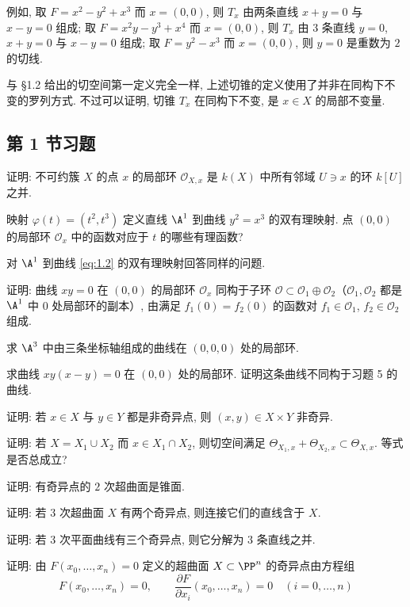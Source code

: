 例如, 取 $F = x^2 - y^2 + x^3$ 而 $x = (0,0)$, 则 $T_x$ 由两条直线 $x + y = 0$ 与 $x - y = 0$ 组成; 取 $F = x^2 y - y^3 + x^4$ 而 $x = (0,0)$, 则 $T_x$ 由 $3$ 条直线 $y = 0$, $x + y = 0$ 与 $x - y = 0$ 组成; 取 $F = y^2 - x^3$ 而 $x = (0,0)$, 则 $y = 0$ 是重数为 $2$ 的切线.

与 §1.2 给出的切空间第一定义完全一样, 上述切锥的定义使用了并非在同构下不变的罗列方式. 不过可以证明, 切锥 $T_x$ 在同构下不变, 是 $x \in X$ 的局部不变量.

\subsection{第 1 节习题}

\begin{compactenum}
	\item 证明: 不可约簇 $X$ 的点 $x$ 的局部环 $\mathcal O_{X,x}$ 是 $k(X)$ 中所有邻域 $U \ni x$ 的环 $k[U]$ 之并.
	\item 映射 $\varphi(t) = (t^2, t^3)$ 定义直线 $\A^1$ 到曲线 $y^2 = x^3$ 的双有理映射. 点 $(0,0)$ 的局部环 $\mathcal O_x$ 中的函数对应于 $t$ 的哪些有理函数?
	\item 对 $\A^1$ 到曲线 \eqref{eq:1.2} 的双有理映射回答同样的问题.
	\item 证明: 曲线 $xy = 0$ 在 $(0,0)$ 的局部环 $\mathcal O_x$ 同构于子环 $\mathcal O \subset \mathcal O_1 \oplus \mathcal O_2$（$\mathcal O_1, \mathcal O_2$ 都是 $\A^1$ 中 $0$ 处局部环的副本）, 由满足 $f_1(0) = f_2(0)$ 的函数对 $f_1 \in \mathcal O_1$, $f_2 \in \mathcal O_2$ 组成.
	\item 求 $\A^3$ 中由三条坐标轴组成的曲线在 $(0,0,0)$ 处的局部环.
	\item 求曲线 $xy(x-y) = 0$ 在 $(0,0)$ 处的局部环. 证明这条曲线不同构于习题 5 的曲线.
	\item 证明: 若 $x \in X$ 与 $y \in Y$ 都是非奇异点, 则 $(x,y) \in X \times Y$ 非奇异.
	\item 证明: 若 $X = X_1 \cup X_2$ 而 $x \in X_1 \cap X_2$, 则切空间满足 $\Theta_{X_1,x} + \Theta_{X_2,x} \subset \Theta_{X,x}$. 等式是否总成立?
	\item 证明: 有奇异点的 $2$ 次超曲面是锥面.
	\item 证明: 若 $3$ 次超曲面 $X$ 有两个奇异点, 则连接它们的直线含于 $X$.
	\item 证明: 若 $3$ 次平面曲线有三个奇异点, 则它分解为 $3$ 条直线之并.
	\item 证明: 由 $F(x_0, \ldots, x_n) = 0$ 定义的超曲面 $X \subset \PP^n$ 的奇异点由方程组
	\[
		F(x_0, \ldots, x_n) = 0, \qquad \frac{\partial F}{\partial x_i}(x_0, \ldots, x_n) = 0 \quad (i = 0, \ldots, n)
\]
\end{compactenum}
